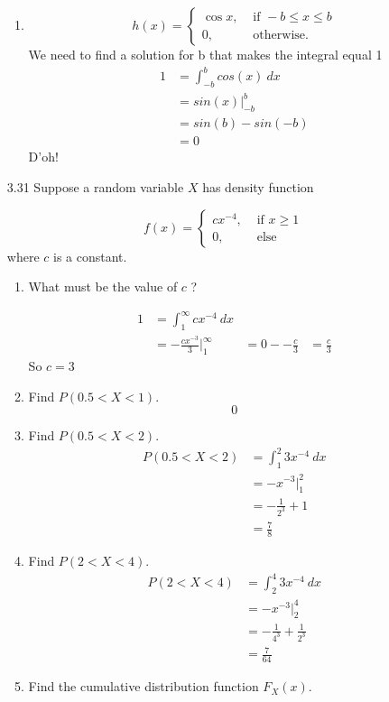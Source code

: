 \documentclass[10pt]{article}
\begin{document}
\begin{itemize}
\begin{enumerate}
      \item
        \[ h(x)=
          \begin{cases}
            \cos x, & \text { if }-b \leq x \leq b \\
            0, & \text { otherwise. }
          \end{cases}
        \]
        We need to find a solution for b that makes the integral equal 1
    \begin{align*}
    1 &= \int_{-b}^{b} {cos(x)} \: d{x} \\
        &= sin(x) \bigg\rvert_{-b}^b \\
                        &= sin(b) - sin(-b) \\
                        &= 0
    \end{align*}
    D'oh!

    \end{enumerate}

\newpage
  \item[3.31] Suppose a random variable $X$ has density function

    \[ f(x)=
      \begin{cases}
        c x^{-4}, & \text { if } x \geq 1 \\
        0, & \text { else }
      \end{cases}
      \]
    where $c$ is a constant.
    \begin{enumerate}
      \item What must be the value of $c$ ?

    \begin{align*}
      1 &= \int_{1}^{\infty} {cx^{-4}} \: d{x} \\
        &= -\frac{cx^{-3}}{3} \bigg\rvert_1^{\infty}
        &= 0 - -\frac{c}{3} 
        &= \frac{c}{3}
    \end{align*}
    So $c = 3$
        
      \item Find $P(0.5<X<1)$.
          \[ 0 \]
      \item Find $P(0.5<X<2)$.
        \begin{align*}
          P(0.5<X<2) &= \int_{1}^{2} {3x^{-4}} \: d{x} \\
            &= -x^{-3} \bigg\rvert_1^{2} \\
            &= -\frac{1}{2^3} + 1 \\
            &= \frac{7}{8}
        \end{align*}
          
      \item Find $P(2<X<4)$.
        \begin{align*}
          P(2<X<4) &= \int_{2}^{4} {3x^{-4}} \: d{x} \\
            &= -x^{-3} \bigg\rvert_2^{4} \\
            &= -\frac{1}{4^3} + \frac{1}{2^3}  \\
            &= \frac{7}{64}
        \end{align*}
      \item Find the cumulative distribution function $F_{X}(x)$.


\end{enumerate}
\end{itemize}
\end{document}
